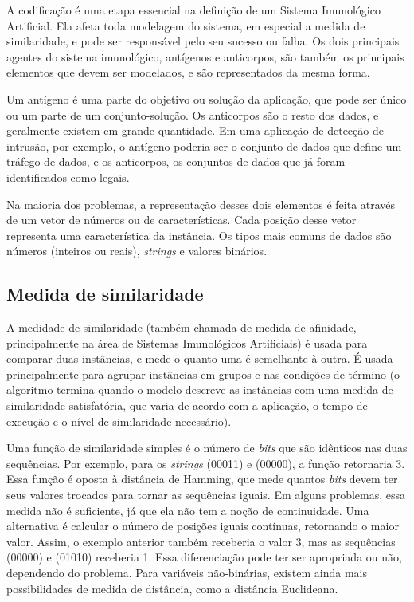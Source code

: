 A codificação é uma etapa essencial na definição de um Sistema Imunológico Artificial. Ela afeta toda modelagem do sistema, em especial a medida de similaridade, e pode ser responsável pelo seu sucesso ou falha. Os dois principais agentes do sistema imunológico, antígenos e anticorpos, são também os principais elementos que devem ser modelados, e são representados da mesma forma.

Um antígeno é uma parte do objetivo ou solução da aplicação, que pode ser único ou um parte de um conjunto-solução. Os anticorpos são o resto dos dados, e geralmente existem em grande quantidade. Em uma aplicação de detecção de intrusão, por exemplo, o antígeno poderia ser o conjunto de dados que define um tráfego de dados, e os anticorpos, os conjuntos de dados que já foram identificados como legais.

Na maioria dos problemas, a representação desses dois elementos é feita através de um vetor de números ou de características. Cada posição desse vetor representa uma característica da instância. Os tipos mais comuns de dados são números (inteiros ou reais), \emph{strings} e valores binários.

\subsection{Medida de similaridade}

A medidade de similaridade (também chamada de medida de afinidade, principalmente na área de Sistemas Imunológicos Artificiais) é usada para comparar duas instâncias, e mede o quanto uma é semelhante à outra. É usada principalmente para agrupar instâncias em grupos e nas condições de término (o algoritmo termina quando o modelo descreve as instâncias com uma medida de similaridade satisfatória, que varia de acordo com a aplicação, o tempo de execução e o nível de similaridade necessário).

Uma função de similaridade simples é o número de \emph{bits} que são idênticos nas duas sequências. Por exemplo, para os \emph{strings} (00011) e (00000), a função retornaria 3. Essa função é oposta à distância de Hamming, que mede quantos \emph{bits} devem ter seus valores trocados para tornar as sequências iguais. Em alguns problemas, essa medida não é suficiente, já que ela não tem a noção de continuidade. Uma alternativa é calcular o número de posições iguais contínuas, retornando o maior valor. Assim, o exemplo anterior também receberia o valor 3, mas as sequências (00000) e (01010) receberia 1. Essa diferenciação pode ter ser apropriada ou não, dependendo do problema. Para variáveis não-binárias, existem ainda mais possibilidades de medida de distância, como a distância Euclideana.

